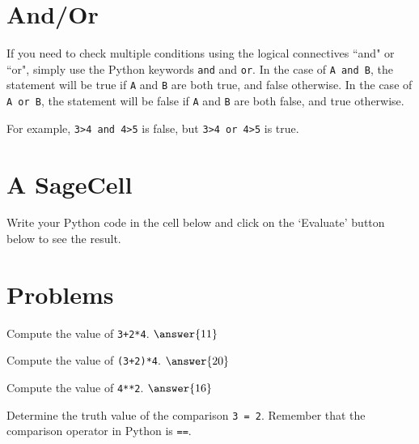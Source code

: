 \documentclass{ximera}
\begin{document}
\section{And/Or}

If you need to check multiple conditions using the logical connectives ``and" or ``or", simply use the Python keywords \verb|and| and \verb|or|. In the case of \verb|A and B|, the statement will be true if \verb|A| and \verb|B| are both true, and false otherwise. In the case of \verb|A or B|, the statement will be false if \verb|A| and \verb|B| are both false, and true otherwise.

For example, \verb|3>4 and 4>5| is false, but \verb|3>4 or 4>5| is true.

\section{A SageCell}

Write your Python code in the cell below and click on the `Evaluate' button below to see the result.

\begin{sageCell}

\end{sageCell}

\section{Problems}

\begin{question}
	Compute the value of \verb|3+2*4|. $\answer{11}$
\end{question}

\begin{question}
	Compute the value of \verb|(3+2)*4|. $\answer{20}$
\end{question}

\begin{question}
	Compute the value of \verb|4**2|. $\answer{16}$
\end{question}

\begin{question}
	Determine the truth value of the comparison \verb|3 = 2|. Remember that the comparison operator in Python is \verb|==|.
	\begin{multipleChoice}
	\end{multipleChoice}
\end{question}
\end{document}
